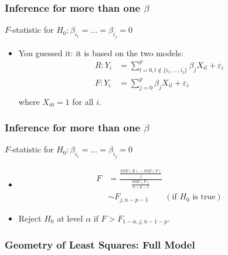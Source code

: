 \documentclass[handout]{beamer}
\begin{document}
   \begin{frame} \frametitle{Inference for more than one $\beta$}

   \begin{block}
   {$F$-statistic for $H_0:\beta_{i_1}=\dots=\beta_{i_j}=0$}
   \begin{itemize}
   \item You guessed it: it is based on the two models:
   $$
   \begin{aligned}
   R: Y_i &= \sum_{l=0, l \not \in \{i_1, \dots, i_j\}}^p \beta_j X_{il} + \varepsilon_i \\
   F: Y_i &=  \sum_{j=0}^p \beta_j X_{il} + \varepsilon_i \\
   \end{aligned}
   $$
   where $X_{i0}=1$ for all $i$.
   \end{itemize}
   \end{block}
   \end{frame}


   \begin{frame} \frametitle{Inference for more than one $\beta$}

   \begin{block}
   {$F$-statistic for $H_0:\beta_{i_1}=\dots=\beta_{i_j}=0$}
   \begin{itemize}
   \item  $$
   \begin{aligned}
   F &=\frac{\frac{SSE(R) - SSE(F)}{j}}{\frac{SSE(F)}{n-p-1}} \\
   & \sim F_{j, n-p-1}     \qquad    (\text{if $H_0$ is true})
   \end{aligned}
   $$
   \item Reject $H_0$ at level $\alpha$ if $F > F_{1-\alpha, j, n-1-p}$.

   \end{itemize}
   \end{block}
   \end{frame}


   \begin{frame} \frametitle{Geometry of Least Squares: Full Model}

   \end{frame}

\end{document}
